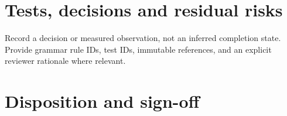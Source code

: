 \documentclass[11pt,letterpaper]{article}
\begin{document}
\section{Tests, decisions and residual risks}
Record a decision or measured observation, not an inferred completion state. Provide grammar rule IDs, test IDs, immutable references, and an explicit reviewer rationale where relevant.
\section{Disposition and sign-off}
\end{document}
